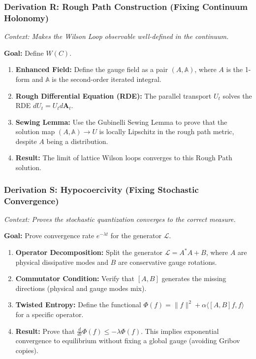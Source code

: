 \subsubsection{Derivation R: Rough Path Construction (Fixing Continuum Holonomy)}

\textit{Context: Makes the Wilson Loop observable well-defined in the continuum.}

\textbf{Goal:} Define $W(C)$.

\begin{enumerate}
    \item \textbf{Enhanced Field:} Define the gauge field as a pair $(A, \mathbb{A})$, where $A$ is the 1-form and $\mathbb{A}$ is the second-order iterated integral.
    \item \textbf{Rough Differential Equation (RDE):} The parallel transport $U_t$ solves the RDE $dU_t = U_t d\mathbf{A}_t$.
    \item \textbf{Sewing Lemma:} Use the Gubinelli Sewing Lemma to prove that the solution map $(A, \mathbb{A}) \to U$ is locally Lipschitz in the rough path metric, despite $A$ being a distribution.
    \item \textbf{Result:} The limit of lattice Wilson loops converges to this Rough Path solution.
\end{enumerate}

\subsubsection{Derivation S: Hypocoercivity (Fixing Stochastic Convergence)}

\textit{Context: Proves the stochastic quantization converges to the correct measure.}

\textbf{Goal:} Prove convergence rate $e^{-\lambda t}$ for the generator $\mathcal{L}$.

\begin{enumerate}
    \item \textbf{Operator Decomposition:} Split the generator $\mathcal{L} = A^*A + B$, where $A$ are physical dissipative modes and $B$ are conservative gauge rotations.
    \item \textbf{Commutator Condition:} Verify that $[A, B]$ generates the missing directions (physical and gauge modes mix).
    \item \textbf{Twisted Entropy:} Define the functional $\Phi(f) = \|f\|^2 + \alpha \langle [A,B]f, f \rangle$ for a specific operator.
    \item \textbf{Result:} Prove that $\frac{d}{dt} \Phi(f) \le - \lambda \Phi(f)$. This implies exponential convergence to equilibrium without fixing a global gauge (avoiding Gribov copies).
\end{enumerate}

